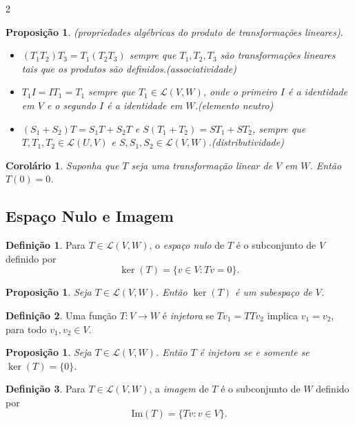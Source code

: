 \documentclass{article}
\theoremstyle{plain}
\newtheorem{prop}[thm]{Proposição}
\newtheorem{cor}[thm]{Corolário}
\theoremstyle{definition}
\newtheorem{defn}{Definição}[section]
\theoremstyle{remark}
\begin{document}
\begin{multicols}{2}
\begin{prop} (propriedades algébricas do produto de transformações lineares).
    \begin{itemize}
        \item \(\left(T_1 T_2\right)T_3 = T_1\left(T_2T_3\right)\) sempre que \(T_1, T_2, T_3\) são transformações lineares tais que os produtos são definidos.\hfill\emph{(associatividade)}
        \item \(T_1I = IT_1 = T_1\) sempre que \(T_1 \in \mathcal{L}(V, W)\), onde o primeiro \(I\) é a identidade em \(V\) e o segundo \(I\) é a identidade em \(W\).\hfill\emph{(elemento neutro)}
        \item \(\left(S_1 + S_2\right)T = S_1T + S_2T\) e \(S\left(T_1 + T_2\right) = ST_1 + ST_2\), sempre que \(T, T_1, T_2 \in \mathcal{L}(U, V)\) e \(S, S_1, S_2 \in \mathcal{L}(V, W)\).\hfill\emph{(distributividade)}
    \end{itemize}
\end{prop}

\begin{cor}
    Suponha que \(T\) seja uma transformação linear de \(V\) em \(W\). Então \(T(0) = 0\).
\end{cor}

\subsection{Espaço Nulo e Imagem}
\begin{defn}
    Para \(T \in \mathcal{L}(V, W)\), o \emph{espaço nulo} de \(T\) é o subconjunto de \(V\) definido por
    \[
        \ker(T) = \{v \in V : Tv = 0\}.
    \]
\end{defn}

\begin{prop}
    Seja \(T \in \mathcal{L}(V, W)\). Então \(\ker(T)\) é um subespaço de \(V\).
\end{prop}

\begin{defn}
    Uma função \(T: V \to W\) é \emph{injetora} se \(Tv_1 = TTv_2\) implica \(v_1 = v_2\), para todo \(v_1, v_2 \in V\).
\end{defn}

\begin{prop}
    Seja \(T \in \mathcal{L}(V, W)\). Então \(T\) é injetora se e somente se \(\ker(T) = \{0\}\).
\end{prop}

\begin{defn}
    Para \(T \in \mathcal{L}(V, W)\), a \emph{imagem} de \(T\) é o subconjunto de \(W\) definido por
    \[
        \text{Im}(T) = \{Tv : v \in V\}.
    \]
\end{defn}


\end{multicols}
\end{document}
